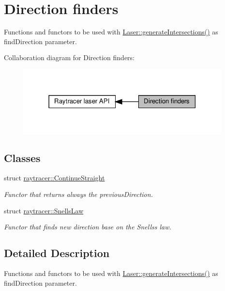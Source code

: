 \hypertarget{group__directionFinders}{}\section{Direction finders}
\label{group__directionFinders}


Functions and functors to be used with \hyperlink{classraytracer_1_1Laser_a40fd2b112fb1de646861d7e93ac303e3}{Laser\+::generate\+Intersections()} as find\+Direction parameter.  


Collaboration diagram for Direction finders\+:
\nopagebreak
\begin{figure}[H]
\begin{center}
\leavevmode
\includegraphics[width=307pt]{group__directionFinders}
\end{center}
\end{figure}
\subsection*{Classes}
\begin{DoxyCompactItemize}
\item 
struct \hyperlink{structraytracer_1_1ContinueStraight}{raytracer\+::\+Continue\+Straight}
\begin{DoxyCompactList}\small\item\em Functor that returns always the previous\+Direction. \end{DoxyCompactList}\item 
struct \hyperlink{structraytracer_1_1SnellsLaw}{raytracer\+::\+Snells\+Law}
\begin{DoxyCompactList}\small\item\em Functor that finds new direction base on the Snells\textquotesingle{}s law. \end{DoxyCompactList}\end{DoxyCompactItemize}


\subsection{Detailed Description}
Functions and functors to be used with \hyperlink{classraytracer_1_1Laser_a40fd2b112fb1de646861d7e93ac303e3}{Laser\+::generate\+Intersections()} as find\+Direction parameter. 

